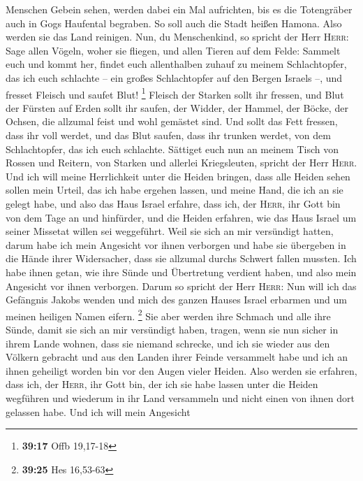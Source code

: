 Menschen Gebein sehen, werden dabei ein Mal aufrichten, bis es die
Totengräber auch in Gogs Haufental begraben.  So soll
auch die Stadt heißen Hamona. Also werden sie das Land reinigen.
 Nun, du Menschenkind, so spricht der Herr \textsc{Herr}:
Sage allen Vögeln, woher sie fliegen, und allen Tieren auf dem Felde:
Sammelt euch und kommt her, findet euch allenthalben zuhauf zu meinem
Schlachtopfer, das ich euch schlachte -- ein großes Schlachtopfer auf
den Bergen Israels --, und fresset Fleisch und saufet Blut! \footnote{\textbf{39:17}
  Offb 19,17-18}  Fleisch der Starken sollt ihr fressen,
und Blut der Fürsten auf Erden sollt ihr saufen, der Widder, der Hammel,
der Böcke, der Ochsen, die allzumal feist und wohl gemästet sind.
 Und sollt das Fett fressen, dass ihr voll werdet, und
das Blut saufen, dass ihr trunken werdet, von dem Schlachtopfer, das ich
euch schlachte.  Sättiget euch nun an meinem Tisch von
Rossen und Reitern, von Starken und allerlei Kriegsleuten, spricht der
Herr \textsc{Herr}.  Und ich will meine Herrlichkeit
unter die Heiden bringen, dass alle Heiden sehen sollen mein Urteil, das
ich habe ergehen lassen, und meine Hand, die ich an sie gelegt habe,
 und also das Haus Israel erfahre, dass ich, der
\textsc{Herr}, ihr Gott bin von dem Tage an und hinfürder,
 und die Heiden erfahren, wie das Haus Israel um seiner
Missetat willen sei weggeführt. Weil sie sich an mir versündigt hatten,
darum habe ich mein Angesicht vor ihnen verborgen und habe sie übergeben
in die Hände ihrer Widersacher, dass sie allzumal durchs Schwert fallen
mussten.  Ich habe ihnen getan, wie ihre Sünde und
Übertretung verdient haben, und also mein Angesicht vor ihnen verborgen.
 Darum so spricht der Herr \textsc{Herr}: Nun will ich
das Gefängnis Jakobs wenden und mich des ganzen Hauses Israel erbarmen
und um meinen heiligen Namen eifern. \footnote{\textbf{39:25} Hes
  16,53-63}  Sie aber werden ihre Schmach und alle ihre
Sünde, damit sie sich an mir versündigt haben, tragen, wenn sie nun
sicher in ihrem Lande wohnen, dass sie niemand schrecke, 
und ich sie wieder aus den Völkern gebracht und aus den Landen ihrer
Feinde versammelt habe und ich an ihnen geheiligt worden bin vor den
Augen vieler Heiden.  Also werden sie erfahren, dass ich,
der \textsc{Herr}, ihr Gott bin, der ich sie habe lassen unter die
Heiden wegführen und wiederum in ihr Land versammeln und nicht einen von
ihnen dort gelassen habe.  Und ich will mein Angesicht
